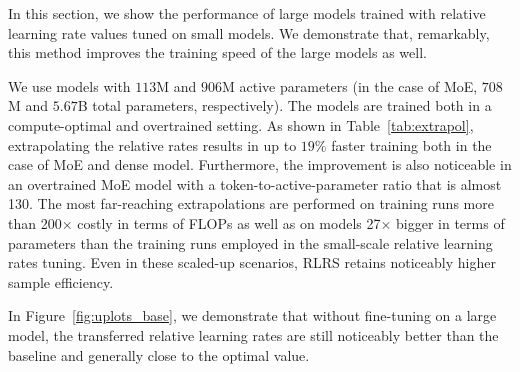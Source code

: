 \documentclass{article}
\theoremstyle{plain}
\theoremstyle{definition}
\theoremstyle{remark}
\newcommand{\kas}[1]{\textcolor{magenta}{\sout{#1}}}
\newcommand{\jl}[1]{\textcolor{green}{[JL: #1]}}
\begin{document}
    
    
    In this section, we show the performance of large models trained with relative learning rate values tuned on small models. We demonstrate that, remarkably, this method improves the training speed of the large models as well.
    
    We use models with $113$M and $906$M active parameters (in the case of MoE, $708$M and $5.67$B total parameters, respectively). The models are trained both in a compute-optimal and overtrained setting.  
    As shown in Table~\ref{tab:extrapol}, extrapolating the relative rates results in up to $19\%$ faster training both in the case of MoE and dense model. Furthermore, the improvement is also noticeable in an overtrained MoE model with a token-to-active-parameter ratio that is almost 130. The most far-reaching extrapolations are performed on training runs more than 200$\times$ costly in terms of FLOPs as well as on models 27$\times$ bigger in terms of parameters than the training runs employed in the small-scale relative learning rates tuning. Even in these scaled-up scenarios, RLRS retains noticeably higher sample efficiency.
    
    In Figure~\ref{fig:uplots_base}, we demonstrate that without fine-tuning on a large model, the transferred relative learning rates are still noticeably better than the baseline and generally close to the optimal value. 
    
    
    
\end{document}
